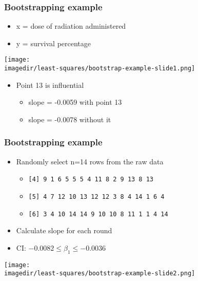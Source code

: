 \begin{frame}\frametitle{Bootstrapping example}
	\begin{itemize}
		\item	x = dose of radiation administered 
		\item	y = survival percentage 
	\end{itemize}
	\begin{center}
		\texttt{[image: \\imagedir/least-squares/bootstrap-example-slide1.png]}
	\end{center}
	\begin{itemize}
		\item	Point 13 is influential 
		\begin{itemize}
			\item	slope = -0.0059 with point 13 
			\item	slope = -0.0078 without it 
		\end{itemize}
	\end{itemize}
\end{frame}

\begin{frame}\frametitle{Bootstrapping example}
	\begin{itemize}
		\item	Randomly select n=14 rows from the raw data 
		\begin{itemize}
			\item	\texttt{[4] 9 1 6 5 5 5 4 11 8 2 9 13 8 13} 
			\item	\texttt{[5] 4 7 12 10 13 12 12 3 8 4 14 1 6 4} 
			\item	\texttt{[6] 3 4 10 14 14 9 10 10 8 11 1 1 4 14} 
		\end{itemize}
		\item	Calculate slope for each round 
		\item	CI: $-0.0082 \leq \beta_1 \leq -0.0036$ 
	\end{itemize}
	\begin{center}
		\texttt{[image: \\imagedir/least-squares/bootstrap-example-slide2.png]}
	\end{center}
\end{frame}

